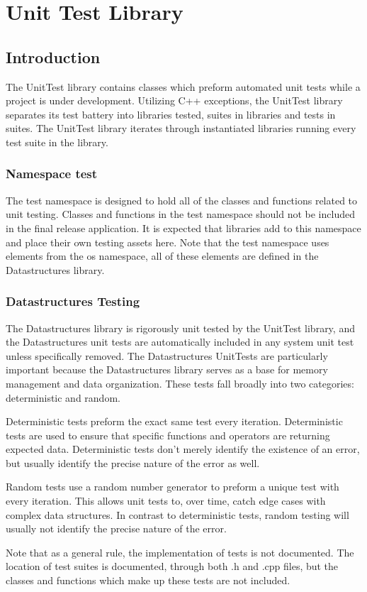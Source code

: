 \part{Unit Test Library} \label{sec:unit-test}

\chapter{Introduction}

The UnitTest library contains classes which preform automated unit tests while a project is under development.  Utilizing C++ exceptions, the UnitTest library separates its test battery into libraries tested, suites in libraries and tests in suites.  The UnitTest library iterates through instantiated libraries running every test suite in the library.

	\section{Namespace test}
	
	The test namespace is designed to hold all of the classes and functions related to unit testing.  Classes and functions in the test namespace should not be included in the final release application.  It is expected that libraries add to this namespace and place their own testing assets here.  Note that the test namespace uses elements from the os namespace, all of these elements are defined in the Datastructures library.

	\section{Datastructures Testing} \label{subsec:datastructures-testing}
	
	The Datastructures library is rigorously unit tested by the UnitTest library, and the Datastructures unit tests are automatically included in any system unit test unless specifically removed.  The Datastructures UnitTests are particularly important because the Datastructures library serves as a base for memory management and data organization.  These tests fall broadly into two categories: deterministic and random.
	
	Deterministic tests preform the exact same test every iteration.  Deterministic tests are used to ensure that specific functions and operators are returning expected data.  Deterministic tests don't merely identify the existence of an error, but usually identify the precise nature of the error as well.
	
	Random tests use a random number generator to preform a unique test with every iteration.  This allows unit tests to, over time, catch edge cases with complex data structures.  In contrast to deterministic tests, random testing will usually not identify the precise nature of the error.

	Note that as a general rule, the implementation of tests is not documented.  The location of test suites is documented, through both .h and .cpp files, but the classes and functions which make up these tests are not included.
		